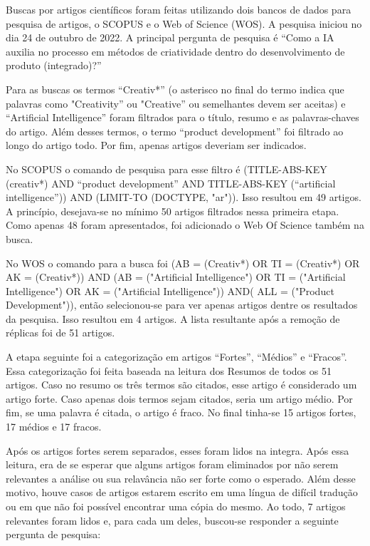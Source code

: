Buscas por artigos científicos foram feitas utilizando dois bancos de dados para pesquisa de artigos, o SCOPUS e o Web of Science (WOS). A pesquisa iniciou no dia 24 de outubro de 2022. A principal pergunta de pesquisa é “Como a IA auxilia no processo em métodos de criatividade dentro do desenvolvimento de produto (integrado)?”

Para as buscas os termos “Creativ*” (o asterisco no final do termo indica que palavras como "Creativity” ou "Creative” ou semelhantes devem ser aceitas) e “Artificial Intelligence” foram filtrados para o título, resumo e as palavras-chaves do artigo. Além desses termos, o termo “product development” foi filtrado ao longo do artigo todo. Por fim, apenas artigos deveriam ser indicados. 

No SCOPUS o comando de pesquisa para esse filtro é (TITLE-ABS-KEY (creativ*) AND “product  development” AND TITLE-ABS-KEY (“artificial intelligence”)) AND (LIMIT-TO (DOCTYPE, "ar")). Isso resultou em 49 artigos. A princípio, desejava-se no mínimo 50 artigos filtrados nessa primeira etapa. Como apenas 48 foram apresentados, foi adicionado o Web Of Science também na busca.

No WOS o comando para a busca foi (AB = (Creativ*) OR TI = (Creativ*) OR AK = (Creativ*)) AND (AB = ("Artificial Intelligence") OR TI = ("Artificial Intelligence") OR AK = ("Artificial Intelligence")) AND( ALL = ("Product Development")), então selecionou-se para ver apenas artigos dentre os resultados da pesquisa. Isso resultou em 4 artigos. A lista resultante após a remoção de réplicas foi de 51 artigos. 

A etapa seguinte foi a categorização em artigos “Fortes”, “Médios” e “Fracos”. Essa categorização foi feita baseada na leitura dos Resumos de todos os 51 artigos. Caso no resumo os três termos são citados, esse artigo é considerado um artigo forte. Caso apenas dois termos sejam citados, seria um artigo médio. Por fim, se uma palavra é citada, o artigo é fraco. No final tinha-se 15 artigos fortes, 17 médios e 17 fracos.

Após os artigos fortes serem separados, esses foram lidos na integra. Após essa leitura, era de se esperar que alguns artigos foram eliminados por não serem relevantes a análise ou sua relavância não ser forte como o esperado. Além desse motivo, houve casos de artigos estarem escrito em uma língua de difícil tradução ou em que não foi possível encontrar uma cópia do mesmo. Ao todo, 7 artigos relevantes foram lidos e, para cada um deles, buscou-se responder a seguinte pergunta de pesquisa:

